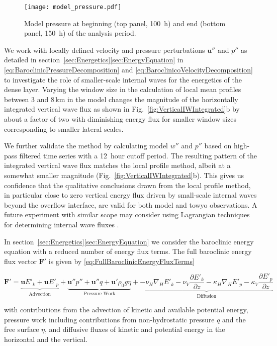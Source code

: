 \documentclass{ametsocV6.1}
\begin{document}
\begin{figure}
\centerline{\texttt{[image: model\_pressure.pdf]}}
\caption{Model pressure at beginning (top panel, 100~h) and end (bottom panel, 150~h) of the analysis period.}
\label{fig:ModelPressureComponents}
\end{figure}


\appendix[B]
We work with locally defined velocity and pressure perturbations $\mathbf{u''}$ and $p''$ as detailed in section~\ref{sec:Energetics}\ref{sec:EnergyEquation} in \eqref{eq:BaroclinicPressureDecomposition} and \eqref{eq:BaroclinicoVelocityDecomposition} to investigate the role of smaller-scale internal waves for the energetics of the dense layer.
Varying the window size in the calculation of local mean profiles between 3 and 8\,km in the model changes the magnitude of the horizontally integrated vertical wave flux as shown in Fig.~\ref{fig:VerticalIWIntegrated}b by about a factor of two with diminishing energy flux for smaller window sizes corresponding to smaller lateral scales.

We further validate the method by calculating model $w''$ and $p''$ based on high-pass filtered time series with a 12~hour cutoff period.
The resulting pattern of the integrated vertical wave flux matches the local profile method, albeit at a somewhat smaller magnitude (Fig.~\ref{fig:VerticalIWIntegrated}b).
This gives us confidence that the qualitative conclusions drawn from the local profile method, in particular close to zero vertical energy flux driven by small-scale internal waves beyond the overflow interface, are valid for both model and towyo observations.
A future experiment with similar scope may consider using Lagrangian techniques for determining internal wave fluxes \citep[e.g.][]{shakespearehogg18, bachmanetal20}.


\appendix[C]
In section~\ref{sec:Energetics}\ref{sec:EnergyEquation} we consider the baroclinic energy equation with a reduced number of energy flux terms. The full baroclinic energy flux vector $\mathbf{F'}$ is given by \eqref{eq:FullBaroclinicEnergyFluxTerms}
\begin{table*}[h!t]
\begin{equation}
\mathbf{F'} = \underbrace{\mathbf{u}E'_k + \mathbf{u}E'_p}_\text{Advection} + \underbrace{\mathbf{u''}p'' + \mathbf{u''}q + \mathbf{u'}\rho_0 g \eta }_\text{Pressure Work} + \underbrace{-\nu_H \nabla_H E'_k -\nu_V \frac{\partial E'_k}{\partial z} - \kappa_H \nabla_H E'_p -\kappa_V \frac{\partial E'_p}{\partial z} }_\text{Diffusion} 
\label{eq:FullBaroclinicEnergyFluxTerms}
\end{equation}
\end{table*}
with contributions from the advection of kinetic and available potential energy, pressure work including contributions from non-hydrostatic pressure $q$ and the free surface $\eta$, and diffusive fluxes of kinetic and potential energy in the horizontal and the vertical.
\end{document}
